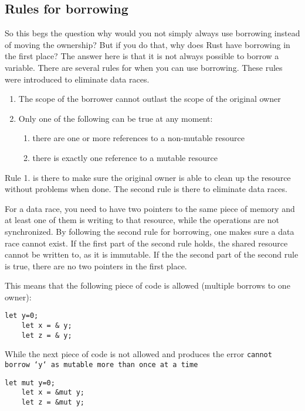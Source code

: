 \subsection{Rules for borrowing}
So this begs the question why would you not simply always use borrowing instead of moving the ownership? But if you do that, why does Rust have borrowing in the first place? The answer here is that it is not always possible to borrow a variable. There are several rules for when you can use borrowing. These rules were introduced to eliminate data races. 
\begin{enumerate}[noitemsep]
    \item The scope of the borrower cannot outlast the scope of the original owner
\item Only one of the following can be true at any moment:
    \begin{enumerate}[noitemsep]
        \item there are one or more references to a non-mutable resource
        \item there is exactly one reference to a mutable resource
    \end{enumerate}
\end{enumerate}

Rule 1. is there to make sure the original owner is able to clean up the resource without problems when done. The second rule is there to eliminate data races. 

For a data race, you need to have two pointers to the same piece of memory and at least one of them is writing to that resource, while the operations are not synchronized. By following the second rule for borrowing, one makes sure a data race cannot exist. If the first part of the second rule holds, the shared resource cannot be written to, as it is immutable. If the the second part of the second rule is true, there are no two pointers in the first place. 

This means that the following piece of code is allowed (multiple borrows to one owner):

\begin{verbatim}
let y=0;
	let x = & y; 
	let z = & y;
\end{verbatim}

While the next piece of code is not allowed and produces the error \texttt{cannot borrow `y` as mutable more than once at a time}

\begin{verbatim}
let mut y=0;
	let x = &mut y; 
	let z = &mut y;
\end{verbatim}

